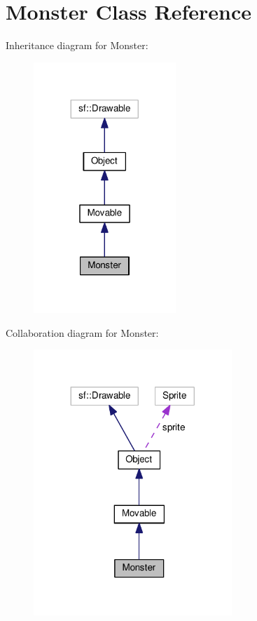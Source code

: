 \hypertarget{classMonster}{\section{Monster Class Reference}
\label{classMonster}
}


Inheritance diagram for Monster\+:
\nopagebreak
\begin{figure}[H]
\begin{center}
\leavevmode
\includegraphics[width=152pt]{classMonster__inherit__graph}
\end{center}
\end{figure}


Collaboration diagram for Monster\+:
\nopagebreak
\begin{figure}[H]
\begin{center}
\leavevmode
\includegraphics[width=212pt]{classMonster__coll__graph}
\end{center}
\end{figure}
